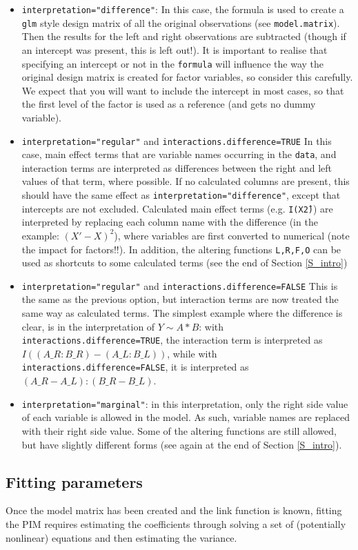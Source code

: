 \documentclass[12pt]{article}
\newcommand{\cd}[1]{\texttt{#1}}%
\begin{document}
\begin{itemize}
	\item {\cd{interpretation="difference"}}: In this case, the formula is used to create a \cd{glm} style design matrix of all the original observations (see \cd{model.matrix}). Then the results for the left and right observations are subtracted (though if an intercept was present, this is left out!). It is important to realise that specifying an intercept or not in the \cd{formula} will influence the way the original design matrix is created for factor variables, so consider this carefully. We expect that you will want to include the intercept in most cases, so that the first level of the factor is used as a reference (and gets no dummy variable).
	\item {\cd{interpretation="regular"} and \cd{interactions.difference=TRUE}} In this case, main effect terms that are variable names occurring in the \cd{data}, and interaction terms are interpreted as differences between the right and left values of that term, where possible. If no calculated columns are present, this should have the same effect as \cd{interpretation="difference"}, except that intercepts are not excluded. Calculated main effect terms (e.g. \cd{I(X\^2)}) are interpreted by replacing each column name with the difference (in the example: \cd{$(X'-X)^2$}), where variables are first converted to numerical (note the impact for factors!!). In addition, the altering functions \cd{L,R,F,O} can be used as shortcuts to some calculated terms (see the end of Section \ref{S_intro})
	\item {\cd{interpretation="regular"} and \cd{interactions.difference=FALSE}} This is the same as the previous option, but interaction terms are now treated the same way as calculated terms. The simplest example where the difference is clear, is in the interpretation of $Y\sim A*B$: with \cd{interactions.difference=TRUE}, the interaction term is interpreted as $I((A\_R:B\_R)-(A\_L:B\_L))$, while with \cd{interactions.difference=FALSE}, it is interpreted as $(A\_R-A\_L):(B\_R-B\_L)$.
	\item {\cd{interpretation="marginal"}}: in this interpretation, only the right side value of each variable is allowed in the model. As such, variable names are replaced with their right side value. Some of the altering functions are still allowed, but have slightly different forms (see again at the end of Section \ref{S_intro}).
\end{itemize}
\subsection{Fitting parameters}\label{SS_fit}
Once the model matrix has been created and the link function is known, fitting the PIM requires estimating the coefficients through solving a set of (potentially nonlinear) equations and then estimating the variance.
\end{document}
